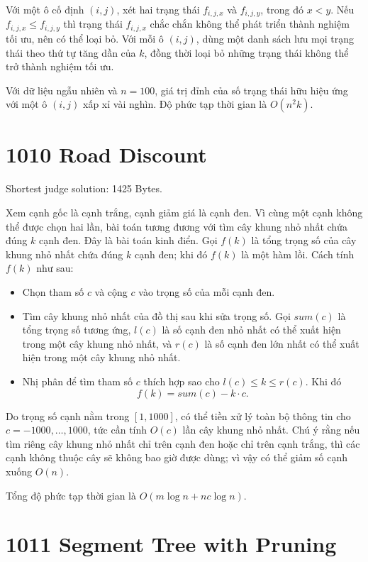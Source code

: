 \documentclass[11pt]{article}
\begin{document}
Với một ô cố định $(i,j)$, xét hai trạng thái $f_{i,j,x}$ và $f_{i,j,y}$,
trong đó $x<y$. Nếu $f_{i,j,x}\le f_{i,j,y}$ thì trạng thái $f_{i,j,x}$ chắc
chắn không thể phát triển thành nghiệm tối ưu, nên có thể loại bỏ. Với mỗi
ô $(i,j)$, dùng một danh sách lưu mọi trạng thái theo thứ tự tăng dần của
$k$, đồng thời loại bỏ những trạng thái không thể trở thành nghiệm tối ưu.

Với dữ liệu ngẫu nhiên và $n=100$, giá trị đỉnh của số trạng thái hữu hiệu
ứng với một ô $(i,j)$ xấp xỉ vài nghìn. Độ phức tạp thời gian là $O(n^2k)$.

\section{1010 Road Discount}

Shortest judge solution: 1425 Bytes.

Xem cạnh gốc là cạnh trắng, cạnh giảm giá là cạnh đen. Vì cùng một cạnh không
thể được chọn hai lần, bài toán tương đương với tìm cây khung nhỏ nhất chứa
đúng $k$ cạnh đen. Đây là bài toán kinh điển. Gọi $f(k)$ là tổng trọng số của
cây khung nhỏ nhất chứa đúng $k$ cạnh đen; khi đó $f(k)$ là một hàm lồi. Cách
tính $f(k)$ như sau:

\begin{itemize}
  \item Chọn tham số $c$ và cộng $c$ vào trọng số của mỗi cạnh đen.
  \item Tìm cây khung nhỏ nhất của đồ thị sau khi sửa trọng số. Gọi
  $\mathit{sum}(c)$ là tổng trọng số tương ứng, $l(c)$ là số cạnh đen nhỏ
  nhất có thể xuất hiện trong một cây khung nhỏ nhất, và $r(c)$ là số cạnh
  đen lớn nhất có thể xuất hiện trong một cây khung nhỏ nhất.
  \item Nhị phân để tìm tham số $c$ thích hợp sao cho $l(c)\le k\le r(c)$.
  Khi đó
  \[
    f(k)=\mathit{sum}(c)-k\cdot c.
  \]
\end{itemize}

Do trọng số cạnh nằm trong $[1,1000]$, có thể tiền xử lý toàn bộ thông tin
cho $c=-1000,\ldots,1000$, tức cần tính $O(c)$ lần cây khung nhỏ nhất. Chú ý
rằng nếu tìm riêng cây khung nhỏ nhất chỉ trên cạnh đen hoặc chỉ trên cạnh
trắng, thì các cạnh không thuộc cây sẽ không bao giờ được dùng; vì vậy có thể
giảm số cạnh xuống $O(n)$.

Tổng độ phức tạp thời gian là $O(m\log n+nc\log n)$.

\section{1011 Segment Tree with Pruning}
\end{document}
